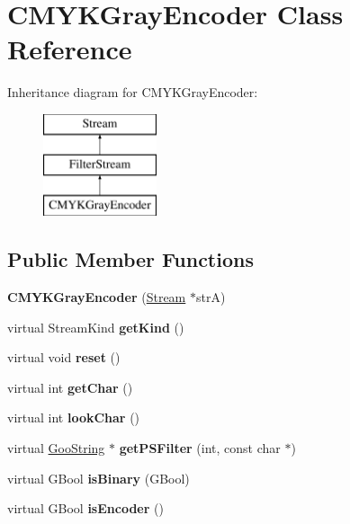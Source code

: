 \hypertarget{class_c_m_y_k_gray_encoder}{}\section{C\+M\+Y\+K\+Gray\+Encoder Class Reference}
\label{class_c_m_y_k_gray_encoder}
Inheritance diagram for C\+M\+Y\+K\+Gray\+Encoder\+:\begin{figure}[H]
\begin{center}
\leavevmode
\includegraphics[height=3.000000cm]{class_c_m_y_k_gray_encoder}
\end{center}
\end{figure}
\subsection*{Public Member Functions}
\begin{DoxyCompactItemize}
\item 
\mbox{\label{class_c_m_y_k_gray_encoder_aacfbd81d8cf7d5f214b6dab89036319e}} 
{\bfseries C\+M\+Y\+K\+Gray\+Encoder} (\hyperlink{class_stream}{Stream} $\ast$strA)
\item 
\mbox{\label{class_c_m_y_k_gray_encoder_ab32964a496475afd063f1d9d46bcdd45}} 
virtual Stream\+Kind {\bfseries get\+Kind} ()
\item 
\mbox{\label{class_c_m_y_k_gray_encoder_a55481352011ae87db99a22be7290dfbe}} 
virtual void {\bfseries reset} ()
\item 
\mbox{\label{class_c_m_y_k_gray_encoder_a9e579e629dcbfb3f0b1d6116f2528720}} 
virtual int {\bfseries get\+Char} ()
\item 
\mbox{\label{class_c_m_y_k_gray_encoder_a90a7fb2816095e7101298ab3f1b8f0ce}} 
virtual int {\bfseries look\+Char} ()
\item 
\mbox{\label{class_c_m_y_k_gray_encoder_a2fbea95701bbe405dec38536b4de8b02}} 
virtual \hyperlink{class_goo_string}{Goo\+String} $\ast$ {\bfseries get\+P\+S\+Filter} (int, const char $\ast$)
\item 
\mbox{\label{class_c_m_y_k_gray_encoder_ab0017d7860984fe457ff6740680876c3}} 
virtual G\+Bool {\bfseries is\+Binary} (G\+Bool)
\item 
\mbox{\label{class_c_m_y_k_gray_encoder_aa238d84dd599cf885e61f7b7bda170d8}} 
virtual G\+Bool {\bfseries is\+Encoder} ()
\end{DoxyCompactItemize}
